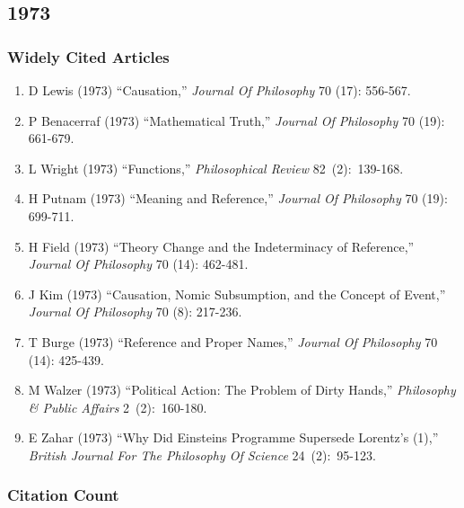 \documentclass[
  10pt,
  letterpaper,
  DIV=11,
  numbers=noendperiod,
  twoside]{scrartcl}
\providecommand{\tightlist}{%
  \setlength{\itemsep}{0pt}\setlength{\parskip}{0pt}}\usepackage{longtable,booktabs,array}
\begin{document}
\newpage

\subsection{1973}\label{sec-s1973}

\subsubsection*{Widely Cited Articles}\label{widely-cited-articles-17}

\begin{enumerate}
\def\labelenumi{\arabic{enumi}.}
\tightlist
\item
  D Lewis (1973) ``Causation,'' \emph{Journal Of Philosophy} 70 (17):
  556-567.
\item
  P Benacerraf (1973) ``Mathematical Truth,'' \emph{Journal Of
  Philosophy} 70 (19): 661-679.
\item
  L Wright (1973) ``Functions,'' \emph{Philosophical Review}
  82~(2):~139-168.
\item
  H Putnam (1973) ``Meaning and Reference,'' \emph{Journal Of
  Philosophy} 70 (19): 699-711.
\item
  H Field (1973) ``Theory Change and the Indeterminacy of Reference,''
  \emph{Journal Of Philosophy} 70 (14): 462-481.
\item
  J Kim (1973) ``Causation, Nomic Subsumption, and the Concept of
  Event,'' \emph{Journal Of Philosophy} 70 (8): 217-236.
\item
  T Burge (1973) ``Reference and Proper Names,'' \emph{Journal Of
  Philosophy} 70 (14): 425-439.
\item
  M Walzer (1973) ``Political Action: The Problem of Dirty Hands,''
  \emph{Philosophy \& Public Affairs} 2~(2):~160-180.
\item
  E Zahar (1973) ``Why Did Einsteins Programme Supersede Lorentz's
  (1),'' \emph{British Journal For The Philosophy Of Science}
  24~(2):~95-123.
\end{enumerate}

\subsubsection*{Citation Count}\label{sec-count-1973}
\end{document}
